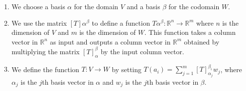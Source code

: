 \documentclass[fontsize=12pt]{scrartcl}
\begin{document}
\begin{enumerate}
	\item We choose a basis $\alpha$ for the domain $V$ and a basis $\beta$ for the codomain $W$.
	\item We use the matrix $\left[T\right]{\alpha}^{\beta}$ to define a function $T{\alpha}^{\beta}: \mathbb{R}^n \to \mathbb{R}^m$ where $n$ is the dimension of $V$ and $m$ is the dimension of $W$. This function takes a column vector in $\mathbb{R}^n$ as input and outputs a column vector in $\mathbb{R}^m$ obtained by multiplying the matrix $\left[T\right]_{\alpha}^{\beta}$ by the input column vector.
	\item We define the function $T: V \to W$ by setting $T(a_i) = \sum_{j=1}^m \left[T\right]_{\alpha_j}^{\beta_i} w_j$, where $\alpha_j$ is the $j$th basis vector in $\alpha$ and $w_j$ is the $j$th basis vector in $\beta$.
\end{enumerate}
\end{document}
